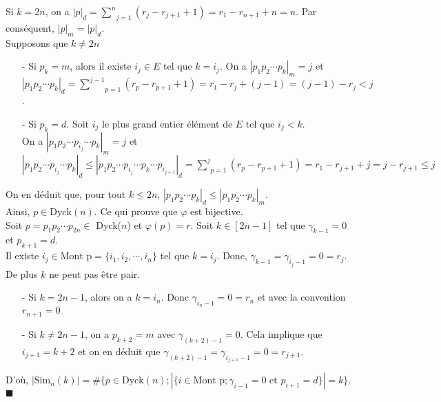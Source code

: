 Si $k=2n$, on a $|p|_{d}=\underset{j=1}{\overset{n}{\sum}}(r_{j}-r_{j+1}+1)=r_{1}-r_{n+1}+n=n$. Par conséquent, $|p|_{m}=|p|_{d}$.\\
Supposons que $k\neq 2n$
\begin{itemize}
	\item [-] Si $p_{k}=m$, alors il existe $i_{j}\in E$ tel que $k=i_{j}$. On a $| p_{1}p_{2}\cdots p_{k} |_{m}=j$ et  \\ $| p_{1}p_{2}\cdots p_{k} |_{d}= \underset{p=1}{\overset{j-1}{\sum}}(r_{p}-r_{p+1}+1)=r_{1}-r_{j}+ (j-1)=(j-1)-r_{j}<j$.
	\item [-] Si $p_{k}=d$. Soit $i_{j}$ le plus grand entier élément de $E$ tel que $i_{j}<k$. \\
	      On a $| p_{1}p_{2}\cdots p_{i_{j}}\cdots p_{k} |_{m}=j$ et\\
	      $| p_{1}p_{2}\cdots p_{i_{j}}\cdots p_{k} |_{d}\leq | p_{1}p_{2}\cdots p_{i_{j}}\cdots p_{k} \cdots p_{i_{j+1}}|_{d}= \underset{p=1}{\overset{j}{\sum}}(r_{p}-r_{p+1}+1)=r_{1}-r_{j+1}+j=j-r_{j+1}\leq j$
\end{itemize}
On en déduit que, pour tout $k \leq 2n$, $| p_{1}p_{2}\cdots p_{k} |_{d} \leq | p_{1}p_{2}\cdots p_{k} |_{m}$.\\ Ainsi, $p\in \text{Dyck}(n)$.
Ce qui prouve que $\varphi$ est bijective.\vspace{10pt}\\
Soit $p=p_{1}p_{2}\cdots p_{2n} \in $ Dyck($n$) et $\varphi(p)=r$.
Soit $k\in [2n-1]$ tel que $\gamma_{k-1}=0$ et $p_{k+1}=d$.\\ Il existe $i_{j}\in \text{Mont p}=\{i_{1}, i_{2}, \cdots, i_{n}\}$ tel que $k=i_{j}$. Donc, $\gamma_{k-1}=\gamma_{i_{j}-1}=0=r_{j}$. De plus $k$ ne peut pas être pair.
\begin{itemize}
	\item [-] Si $k=2n-1$, alors on a $k=i_{n}$. Donc $\gamma_{i_{n}-1}=0=r_{n}$ et avec la convention $r_{n+1}=0$
	\item [-] Si $k\neq 2n-1$, on a $p_{k+2}=m$ avec $\gamma_{(k+2)-1}=0$. Cela implique que $i_{j+1} = k+2$ et on en déduit que $\gamma_{(k+2)-1}=\gamma_{i_{j+1}-1}=0=r_{j+1}$.
\end{itemize}
D'où, $|\text{Sim}_{n}(k)| = \# \{p \in \text{Dyck}(n); |\{i \in \text{Mont p}; \gamma_{i-1}=0 \text{ et } p_{i+1}=d\}|=k\}$. \hspace{10pt}$\blacksquare$

